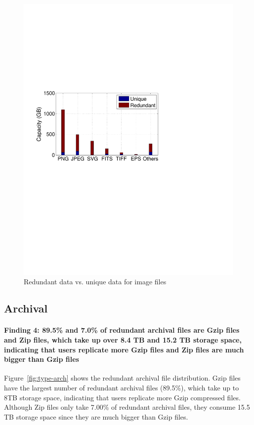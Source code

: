 \begin{figure}[t]
\begin{minipage}{0.28\textwidth}
		\includegraphics[width=1\textwidth]{graphs/type-image-cap}
		\caption{Redundant data vs. unique data for image files}
		\label{fig:type-img}
	\end{minipage}
\end{figure}

\subsection{Archival}
\paragraph{Finding 4: 89.5\% and 7.0\% of redundant archival files are Gzip files and Zip files, which take up over 8.4 TB and 15.2 TB storage space, indicating that users replicate more Gzip files and Zip files are much bigger than Gzip files}

Figure~\ref{fig:type-arch} shows the redundant archival file distribution. Gzip files have the largest number of redundant archival files (89.5\%), which take up to 8TB storage space, indicating that users replicate more Gzip compressed files. Although Zip files only take 7.00\% of redundant archival files, they consume 15.5 TB storage space since they are much bigger than Gzip files.


